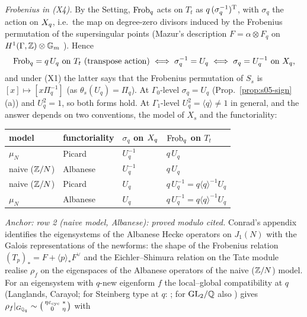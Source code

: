 \begin{remark}
\emph{Frobenius in (X4).} By the Setting, $\mathrm{Frob}_q$ acts on $T_t$ as $q\,(\sigma_q^{-1})^{\rm T}$, with $\sigma_q$ the action on $X_q$,
i.e.\ the map on degree-zero divisors induced by the Frobenius permutation of the supersingular points (Mazur's description
$F=\alpha\otimes F_q$ on $H^1(\Gamma,\mathbb{Z})\otimes\mathbb G_m$
). Hence
\[\Frob_q=q\,U_q\ \text{on }T_t\ (\text{transpose action})\iff\sigma_q^{-1}=U_q\iff\sigma_q=U_q^{-1}\ \text{on }\Xq,\]
and under (X1) the latter says that the Frobenius permutation of $S_s$ is $[x]\mapsto[x\Pi_q^{-1}]$ (as $\theta_s(U_q)=\Pi_q$). At
$\Gamma_0$-level $\sigma_q=U_q$ (Prop.~\ref{prop:s05-sign}(a)) and $U_q^2=1$, so both forms hold. At $\Gamma_1$-level $U_q^2=\langle q\rangle\ne1$ in
general, and the answer depends on two conventions, the model of $X_s$ and the functoriality:
\begin{center}\small
\begin{tabular}{@{}llll@{}}
\toprule
model & functoriality & $\sigma_q$ on $X_q$ & $\mathrm{Frob}_q$ on $T_t$\\\midrule
$\mu_N$ & Picard & $U_q^{-1}$ & $q\,U_q$\\
naive ($\mathbb{Z}/N$) & Albanese & $U_q^{-1}$ & $q\,U_q$\\
naive ($\mathbb{Z}/N$) & Picard & $U_q$ & $q\,U_q^{-1}=q\langle q\rangle^{-1}U_q$\\
$\mu_N$ & Albanese & $U_q$ & $q\,U_q^{-1}=q\langle q\rangle^{-1}U_q$\\
\bottomrule
\end{tabular}
\end{center}
\emph{Anchor: row 2 (naive model, Albanese): proved modulo cited.} Conrad's appendix identifies the eigensystems of the Albanese Hecke
operators on $J_1(N)$ with the Galois representations of the newforms: the shape of the Frobenius relation
$(T_p)_*=F+\langle p\rangle_*F^\vee$ and the Eichler--Shimura relation on the Tate module
realise $\rho_f$ on the eigenspaces of the Albanese operators of the naive ($\mathbb{Z}/N$) model. For an eigensystem with $q$-new eigenform $f$ the
local--global compatibility at $q$ (Langlands, Carayol; for Steinberg type at $q$:
;
for $\mathrm{GL}_2/\mathbb{Q}$ also ) gives $\rho_f|_{G_{\mathbb{Q}_q}}\sim\left(\begin{smallmatrix}\eta\varepsilon_{\rm cyc}&*\\0&\eta\end{smallmatrix}\right)$ with

\end{remark}
